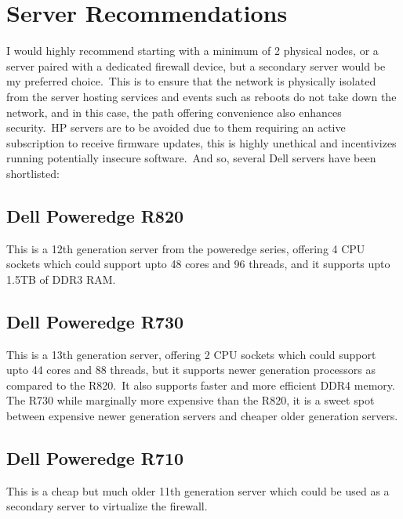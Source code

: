 \section{Server Recommendations}\label{sec:server-recommendations}
I would highly recommend starting with a minimum of 2 physical nodes, or a server paired with a dedicated firewall
device, but a secondary server would be my preferred choice.\ This is to ensure that the network is physically
isolated from the server hosting services and events such as reboots do not take down the network, and in this case,
the path offering convenience also enhances security.\ HP servers are to be avoided due to them requiring an active
subscription to receive firmware updates, this is highly unethical and incentivizes running potentially insecure
software.\ And so, several Dell servers have been shortlisted:


\subsection{Dell Poweredge R820}\label{subsec:dell-poweredge-r820}
This is a 12th generation server from the poweredge series, offering 4 CPU sockets which could support upto 48 cores
and 96 threads, and it supports upto 1.5TB of DDR3 RAM\@.


\subsection{Dell Poweredge R730}\label{subsec:dell-poweredge-r730}
This is a 13th generation server, offering 2 CPU sockets which could support upto 44 cores and 88 threads, but it
supports newer generation processors as compared to the R820.\ It also supports faster and more efficient DDR4 memory.
The R730 while marginally more expensive than the R820, it is a sweet spot between expensive newer generation servers
and cheaper older generation servers.


\subsection{Dell Poweredge R710}\label{subsec:dell-poweredge-r710}
This is a cheap but much older 11th generation server which could be used as a secondary server to virtualize the
firewall.


